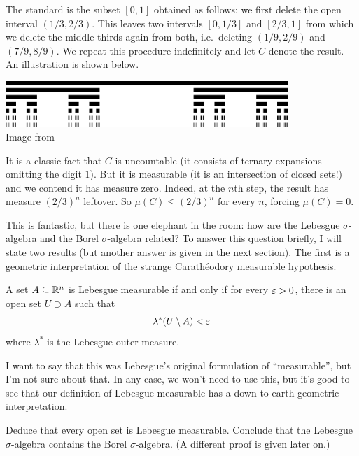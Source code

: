 \begin{example}
	The standard  is the subset
	$[0,1]$ obtained as follows:
	we first delete the open interval $(1/3, 2/3)$.
	This leaves two intervals $[0,1/3]$ and $[2/3,1]$
	from which we delete the middle thirds again from both,
	i.e.\ deleting $(1/9,2/9)$ and $(7/9,8/9)$.
	We repeat this procedure indefinitely and let $C$ denote the result.
	An illustration is shown below.
	\begin{center}
		\includegraphics[width=0.8\textwidth]{media/cantor-thirds.png} \\
		\footnotesize Image from \cite{img:cantor}
	\end{center}
	It is a classic fact that $C$ is uncountable
	(it consists of ternary expansions omitting the digit $1$).
	But it is measurable (it is an intersection of closed sets!)
	and we contend it has measure zero.
	Indeed, at the $n$th step, the result has measure $(2/3)^n$ leftover.
	So $\mu(C) \le (2/3)^n$ for every $n$, forcing $\mu(C) = 0$.
\end{example}

This is fantastic, but there is one elephant in the room:
how are the Lebesgue $\sigma$-algebra and the Borel $\sigma$-algebra related?
To answer this question briefly, I will state two results
(but another answer is given in the next section).
The first is a geometric interpretation of the strange
Carath\'{e}odory measurable hypothesis.
\begin{proposition}
	\label{prop:lebesgue_geo}
	A set $A \subseteq \mathbb R^n$ is Lebesgue measurable
	if and only if for every $\varepsilon > 0$,
	there is an open set $U \supset A$ such that
	\[ \lambda^\ast(U \setminus A) < \varepsilon \]
	where $\lambda^\ast$ is the Lebesgue outer measure.
\end{proposition}
I want to say that this was Lebesgue's original formulation
of ``measurable'', but I'm not sure about that.
In any case, we won't need to use this,
but it's good to see that our definition of Lebesgue measurable
has a down-to-earth geometric interpretation.

\begin{ques}
	Deduce that every open set is Lebesgue measurable.
	Conclude that the Lebesgue $\sigma$-algebra
	contains the Borel $\sigma$-algebra.
	(A different proof is given later on.)
\end{ques}

